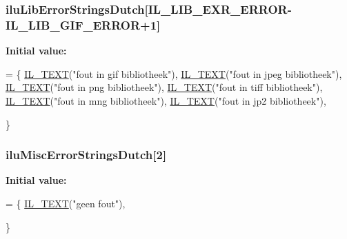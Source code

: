 \hypertarget{ilu__err-dutch_8h_ae58f9e0fd6146064cac3fb3a55510077}{
\subsubsection[{ilu\-Lib\-Error\-Strings\-Dutch}]{ ilu\-Lib\-Error\-Strings\-Dutch\mbox{[}{\bf I\-L\-\_\-\-L\-I\-B\-\_\-\-E\-X\-R\-\_\-\-E\-R\-R\-O\-R}-\/{\bf I\-L\-\_\-\-L\-I\-B\-\_\-\-G\-I\-F\-\_\-\-E\-R\-R\-O\-R}+1\mbox{]}}}\label{ilu__err-dutch_8h_ae58f9e0fd6146064cac3fb3a55510077}
{\bfseries Initial value\-:}
\begin{DoxyCode}
= \{
    \hyperlink{il_8h_a2907c2129d2ba2ebbae6aa6a69b7f685}{IL\_TEXT}(\textcolor{stringliteral}{"fout in gif bibliotheek"}),
    \hyperlink{il_8h_a2907c2129d2ba2ebbae6aa6a69b7f685}{IL\_TEXT}(\textcolor{stringliteral}{"fout in jpeg bibliotheek"}),
    \hyperlink{il_8h_a2907c2129d2ba2ebbae6aa6a69b7f685}{IL\_TEXT}(\textcolor{stringliteral}{"fout in png bibliotheek"}),
    \hyperlink{il_8h_a2907c2129d2ba2ebbae6aa6a69b7f685}{IL\_TEXT}(\textcolor{stringliteral}{"fout in tiff bibliotheek"}),
    \hyperlink{il_8h_a2907c2129d2ba2ebbae6aa6a69b7f685}{IL\_TEXT}(\textcolor{stringliteral}{"fout in mng bibliotheek"}),
    \hyperlink{il_8h_a2907c2129d2ba2ebbae6aa6a69b7f685}{IL\_TEXT}(\textcolor{stringliteral}{"fout in jp2 bibliotheek"}),

\}
\end{DoxyCode}
\hypertarget{ilu__err-dutch_8h_ae2160d5779eabd12d4ddd027e6dc9958}{
\subsubsection[{ilu\-Misc\-Error\-Strings\-Dutch}]{ ilu\-Misc\-Error\-Strings\-Dutch\mbox{[}2\mbox{]}}}\label{ilu__err-dutch_8h_ae2160d5779eabd12d4ddd027e6dc9958}
{\bfseries Initial value\-:}
\begin{DoxyCode}
= \{
    \hyperlink{il_8h_a2907c2129d2ba2ebbae6aa6a69b7f685}{IL\_TEXT}(\textcolor{stringliteral}{"geen fout"}),

\}
\end{DoxyCode}
